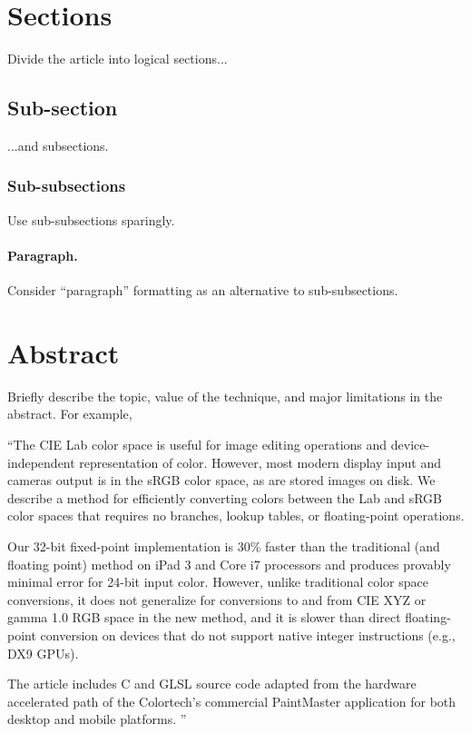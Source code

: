 \documentclass{jcgt}
\begin{document}
\section{Sections}
Divide the article into logical sections...

\subsection{Sub-section}
...and subsections.

\subsubsection{Sub-subsections}
Use sub-subsections sparingly.

\paragraph{Paragraph.} Consider ``paragraph'' formatting as an alternative to sub-subsections.


\section{Abstract}
Briefly describe the topic, value of the technique, and major limitations in the abstract. For example,

``The CIE Lab color  space is useful for image editing operations and device-independent representation of
color.  However, most modern display  input  and  cameras  output is in the sRGB color space, as are stored images on disk.  We describe a method for
efficiently converting colors between the Lab and sRGB color spaces that requires no branches,  lookup tables, or floating-point operations.

Our 32-bit fixed-point
implementation is 30\% faster than the traditional (and floating point) method on
iPad 3 and Core i7 processors and produces provably
minimal error for 24-bit input color.  However,  unlike traditional color space
conversions, it does not generalize for conversions to and from CIE XYZ or
gamma 1.0 RGB space in the new method, and it is slower than direct floating-point
conversion on devices that do not support native integer instructions (e.g., DX9 GPUs).

The article includes C and GLSL source code adapted from the hardware accelerated path of the Colortech's commercial PaintMaster application for
both desktop and mobile platforms. ''
\end{document}
